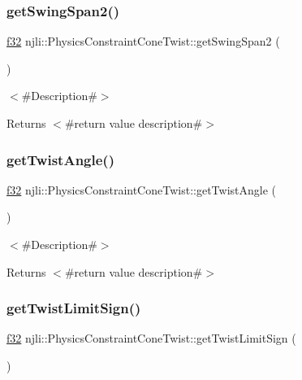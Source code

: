 \subsubsection{\texorpdfstring{get\+Swing\+Span2()}{getSwingSpan2()}}
{\footnotesize\ttfamily \mbox{\hyperlink{_util_8h_a5f6906312a689f27d70e9d086649d3fd}{f32}} njli\+::\+Physics\+Constraint\+Cone\+Twist\+::get\+Swing\+Span2 (\begin{DoxyParamCaption}{ }\end{DoxyParamCaption})}

$<$\#\+Description\#$>$

\begin{DoxyReturn}{Returns}
$<$\#return value description\#$>$ 
\end{DoxyReturn}
\mbox{\label{classnjli_1_1_physics_constraint_cone_twist_a456096ba5a6602c65e1cfdacd2e155ad}} 
\subsubsection{\texorpdfstring{get\+Twist\+Angle()}{getTwistAngle()}}
{\footnotesize\ttfamily \mbox{\hyperlink{_util_8h_a5f6906312a689f27d70e9d086649d3fd}{f32}} njli\+::\+Physics\+Constraint\+Cone\+Twist\+::get\+Twist\+Angle (\begin{DoxyParamCaption}{ }\end{DoxyParamCaption})}

$<$\#\+Description\#$>$

\begin{DoxyReturn}{Returns}
$<$\#return value description\#$>$ 
\end{DoxyReturn}
\mbox{\label{classnjli_1_1_physics_constraint_cone_twist_acee80e920f51081de9354094379f7b11}} 
\subsubsection{\texorpdfstring{get\+Twist\+Limit\+Sign()}{getTwistLimitSign()}}
{\footnotesize\ttfamily \mbox{\hyperlink{_util_8h_a5f6906312a689f27d70e9d086649d3fd}{f32}} njli\+::\+Physics\+Constraint\+Cone\+Twist\+::get\+Twist\+Limit\+Sign (\begin{DoxyParamCaption}{ }\end{DoxyParamCaption})}

